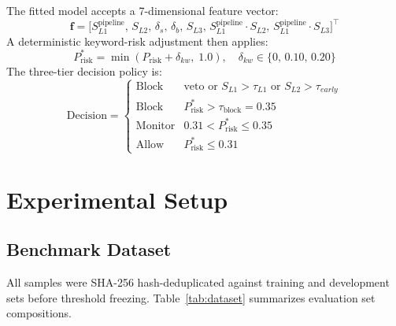 ﻿\documentclass[conference]{IEEEtran}
\begin{document}
The fitted model accepts a 7-dimensional feature vector:
\begin{equation}
\mathbf{f} = \bigl[ S_{L1}^{\text{pipeline}},\, S_{L2},\, \delta_s,\,
  \delta_b,\, S_{L3},\, S_{L1}^{\text{pipeline}}{\cdot}S_{L2},\,
  S_{L1}^{\text{pipeline}}{\cdot}S_{L3} \bigr]^{\top}
\end{equation}
A deterministic keyword-risk adjustment then applies:
\begin{equation}
P_{\mathrm{risk}}^{*} = \min\!\left(P_{\mathrm{risk}} + \delta_{kw},\;
  1.0\right), \quad \delta_{kw} \in \{0,\,0.10,\,0.20\}
\end{equation}
The three-tier decision policy is:
\begin{equation}
\text{Decision} = \begin{cases}
\text{Block}   & \text{veto or } S_{L1}\!>\!\tau_{L1}
                 \text{ or } S_{L2}\!>\!\tau_{early}\\
\text{Block}   & P_{\mathrm{risk}}^{*} > \tau_{\mathrm{block}} = 0.35\\
\text{Monitor} & 0.31 < P_{\mathrm{risk}}^{*} \leq 0.35\\
\text{Allow}   & P_{\mathrm{risk}}^{*} \leq 0.31
\end{cases}
\end{equation}

\section{Experimental Setup}

\subsection{Benchmark Dataset}

All samples were SHA-256 hash-deduplicated against training and development
sets before threshold freezing.
Table~\ref{tab:dataset} summarizes evaluation set compositions.
\end{document}

